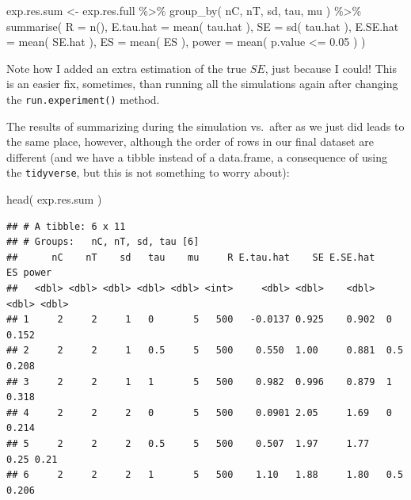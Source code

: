 \documentclass[
]{book}
\newenvironment{Shaded}{\begin{snugshade}}{\end{snugshade}}
\newcommand{\AttributeTok}[1]{\textcolor[rgb]{0.77,0.63,0.00}{#1}}
\newcommand{\FloatTok}[1]{\textcolor[rgb]{0.00,0.00,0.81}{#1}}
\newcommand{\FunctionTok}[1]{\textcolor[rgb]{0.00,0.00,0.00}{#1}}
\newcommand{\NormalTok}[1]{#1}
\newcommand{\OtherTok}[1]{\textcolor[rgb]{0.56,0.35,0.01}{#1}}
\newcommand{\SpecialCharTok}[1]{\textcolor[rgb]{0.00,0.00,0.00}{#1}}
\begin{document}
\begin{Shaded}
\begin{Highlighting}[]
\NormalTok{exp.res.sum }\OtherTok{\textless{}{-}}\NormalTok{ exp.res.full }\SpecialCharTok{\%\textgreater{}\%}
  \FunctionTok{group\_by}\NormalTok{( nC, nT, sd, tau, mu ) }\SpecialCharTok{\%\textgreater{}\%}
  \FunctionTok{summarise}\NormalTok{( }\AttributeTok{R =} \FunctionTok{n}\NormalTok{(),}
             \AttributeTok{E.tau.hat =} \FunctionTok{mean}\NormalTok{( tau.hat ),}
             \AttributeTok{SE =} \FunctionTok{sd}\NormalTok{( tau.hat ),}
             \AttributeTok{E.SE.hat =} \FunctionTok{mean}\NormalTok{( SE.hat ),}
             \AttributeTok{ES =} \FunctionTok{mean}\NormalTok{( ES ),}
             \AttributeTok{power =} \FunctionTok{mean}\NormalTok{( p.value }\SpecialCharTok{\textless{}=} \FloatTok{0.05}\NormalTok{ ) )}
\end{Highlighting}
\end{Shaded}

Note how I added an extra estimation of the true \(SE\), just because I could!
This is an easier fix, sometimes, than running all the simulations again
after changing the \texttt{run.experiment()} method.

The results of summarizing during the simulation vs.~after as we just did
leads to the same place, however, although the order of rows in our final
dataset are different (and we have a tibble instead of a data.frame, a
consequence of using the \texttt{tidyverse}, but this is not something to worry
about):

\begin{Shaded}
\begin{Highlighting}[]
\FunctionTok{head}\NormalTok{( exp.res.sum )}
\end{Highlighting}
\end{Shaded}

\begin{verbatim}
## # A tibble: 6 x 11
## # Groups:   nC, nT, sd, tau [6]
##      nC    nT    sd   tau    mu     R E.tau.hat    SE E.SE.hat    ES power
##   <dbl> <dbl> <dbl> <dbl> <dbl> <int>     <dbl> <dbl>    <dbl> <dbl> <dbl>
## 1     2     2     1   0       5   500   -0.0137 0.925    0.902  0    0.152
## 2     2     2     1   0.5     5   500    0.550  1.00     0.881  0.5  0.208
## 3     2     2     1   1       5   500    0.982  0.996    0.879  1    0.318
## 4     2     2     2   0       5   500    0.0901 2.05     1.69   0    0.214
## 5     2     2     2   0.5     5   500    0.507  1.97     1.77   0.25 0.21 
## 6     2     2     2   1       5   500    1.10   1.88     1.80   0.5  0.206
\end{verbatim}
\end{document}
